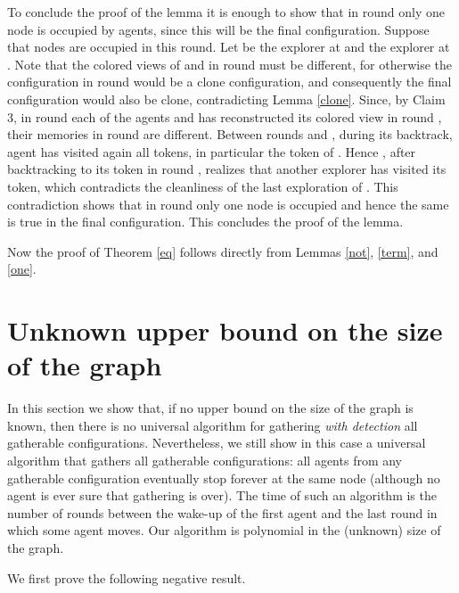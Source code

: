 \documentclass[11pt]{article}
\newcommand{\qed}{\hfill  \bigbreak}
\newenvironment{proof}{\noindent {\bf Proof.}}{\qed}
\begin{document}
\begin{proof}
To conclude the proof of the lemma it is enough to show that in round  only one node is occupied by agents, since this will be the final configuration.
Suppose that nodes  are occupied in this round. Let  be the explorer at  and  the explorer at . Note that the colored views of  and 
in round 
must be different, for otherwise the configuration in round  would be a clone configuration, and consequently the final configuration would also be clone,
contradicting Lemma \ref{clone}. Since, by Claim 3, in round  each of the agents  and  has reconstructed its colored view in round  , their memories in round  are different. Between rounds   and , during its backtrack, agent  has visited again all tokens, 
in particular the token of . Hence , after backtracking
to its token in round ,  realizes that another explorer has visited its token, which contradicts the cleanliness of the last exploration of .
This contradiction shows that in round  only one node is occupied and hence the same is true in the final configuration. This concludes the proof of the lemma.
\end{proof}

Now the proof of Theorem \ref{eq} follows directly from Lemmas  \ref{not}, \ref{term},  and \ref{one}. 
 

 
 
 
 
 
 
 
 
 

 


\section{Unknown upper bound on the size of the graph}

In this section we show that, if no upper bound on the size of the graph is known, then there is no universal algorithm for gathering
{\em with detection} all gatherable configurations. Nevertheless, we still show in this case a universal algorithm that gathers all gatherable configurations:
all agents from any gatherable configuration eventually stop forever at the same node (although no agent is ever sure
that gathering is over). The time of such an algorithm is the number of rounds between the wake-up of the first agent and the last round in which some agent moves.
Our algorithm is polynomial in the (unknown) size of the graph.


We first prove the following negative result.
\end{document}
